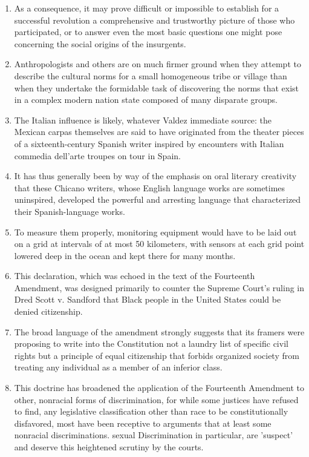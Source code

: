 \begin{enumerate}
\item As a consequence, it may prove difficult or impossible to establish for a
successful revolution a comprehensive and trustworthy picture of those who participated, or to answer even the most basic questions one might pose concerning the social origins of the insurgents.

\item Anthropologists and others are on much firmer ground when they attempt to describe the  cultural norms for a small homogeneous tribe or village than when they undertake the formidable task of discovering the norms that exist in a complex modern nation state composed of many disparate groups.


\item The Italian influence is likely, whatever Valdez immediate source:  the
Mexican carpas themselves are said to have originated from the theater pieces of a sixteenth-century Spanish writer inspired by encounters with Italian commedia dell'arte troupes on tour in Spain.


\item It has thus generally been by way of the emphasis on oral literary creativity that these Chicano writers, whose English language works are sometimes uninspired, developed the powerful and arresting language that characterized their Spanish-language works. 

\item To measure them properly, monitoring equipment would have to be laid
out on a grid at intervals of at most 50 kilometers, with sensors at each grid point lowered deep in the ocean and kept there for many months. 

\item This declaration, which was echoed in the text of the Fourteenth Amendment, was designed primarily to counter the Supreme Court's ruling in Dred Scott v. Sandford that Black people in the United States could be denied citizenship.

\item The broad language of the amendment strongly suggests that its framers
were proposing to write into the Constitution not a laundry list of specific civil rights but a principle of equal citizenship that forbids organized society from treating any individual as a member of an inferior class.

\item This doctrine has broadened the application of the Fourteenth
Amendment to other, nonracial forms of discrimination, for while some justices have refused to find, any legislative  classification other than race to be constitutionally disfavored, most have been receptive to arguments that at least some nonracial discriminations. sexual Discrimination in particular,   are 'suspect' and deserve this heightened scrutiny by the courts.


\end{enumerate}
